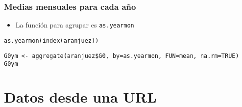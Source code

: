 \documentclass[bigger]{beamer}
\begin{document}
\begin{frame}[fragile]
\frametitle{Medias mensuales para cada año}
\label{sec-2-1-3}

\begin{itemize}
\item La función para agrupar es \texttt{as.yearmon}
\end{itemize}

\lstset{language=R}
\begin{lstlisting}
as.yearmon(index(aranjuez))
\end{lstlisting}


\lstset{language=R}
\begin{lstlisting}
G0ym <- aggregate(aranjuez$G0, by=as.yearmon, FUN=mean, na.rm=TRUE)
G0ym
\end{lstlisting}
\end{frame}
\section{Datos desde una URL}
\label{sec-3}
\end{document}
